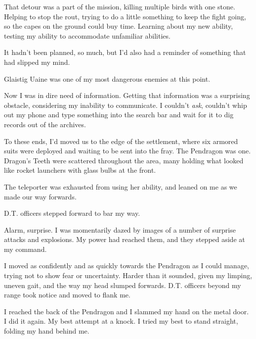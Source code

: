 That detour was a part of the mission, killing multiple birds with one stone.  Helping to stop the rout, trying to do a little something to keep the fight going, so the capes on the ground could buy time.  Learning about my new ability, testing my ability to accommodate unfamiliar abilities.



It hadn't been planned, so much, but I'd also had a reminder of something that had slipped my mind.



Glaistig Uaine was one of my most dangerous enemies at this point.



Now I was in dire need of information.  Getting that information was a surprising obstacle, considering my inability to communicate.  I couldn't \emph{ask}, couldn't whip out my phone and type something into the search bar and wait for it to dig records out of the archives.



To these ends, I'd moved us to the edge of the settlement, where six armored suits were deployed and waiting to be sent into the fray.  The Pendragon was one.  Dragon's Teeth were scattered throughout the area, many holding what looked like rocket launchers with glass bulbs at the front.



The teleporter was exhausted from using her ability, and leaned on me as we made our way forwards.



D.T. officers stepped forward to bar my way.



Alarm, surprise.  I was momentarily dazed by images of a number of surprise attacks and explosions.  My power had reached them, and they stepped aside at my command.



I moved as confidently and as quickly towards the Pendragon as I could manage, trying not to show fear or uncertainty.  Harder than it sounded, given my limping, uneven gait, and the way my head slumped forwards.  D.T. officers beyond my range took notice and moved to flank me.



I reached the back of the Pendragon and I slammed my hand on the metal door.  I did it again.  My best attempt at a knock.  I tried my best to stand straight, folding my hand behind me.



